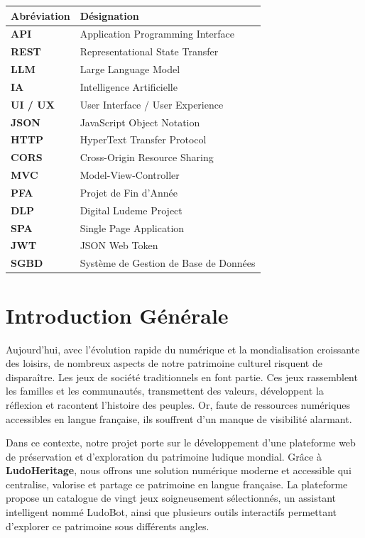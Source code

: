 \documentclass[12pt,a4paper]{report}
\begin{document}
\renewcommand{\arraystretch}{1.7}
\begin{tabular}{>{\bfseries}p{3.5cm} p{10cm}}
\toprule
\textbf{Abréviation} & \textbf{Désignation} \\
\midrule
API     & Application Programming Interface \\
REST    & Representational State Transfer \\
LLM     & Large Language Model \\
IA      & Intelligence Artificielle \\
UI / UX & User Interface / User Experience \\
JSON    & JavaScript Object Notation \\
HTTP    & HyperText Transfer Protocol \\
CORS    & Cross-Origin Resource Sharing \\
MVC     & Model-View-Controller \\
PFA     & Projet de Fin d'Année \\
DLP     & Digital Ludeme Project \\
SPA     & Single Page Application \\
JWT     & JSON Web Token \\
SGBD    & Système de Gestion de Base de Données \\
\bottomrule
\end{tabular}
\renewcommand{\arraystretch}{1}

\newpage
\chapter*{Introduction Générale}
\thispagestyle{fancy}

Aujourd'hui, avec l'évolution rapide du numérique et la mondialisation croissante des
loisirs, de nombreux aspects de notre patrimoine culturel risquent de disparaître. Les
jeux de société traditionnels en font partie. Ces jeux rassemblent les familles et les
communautés, transmettent des valeurs, développent la réflexion et racontent l'histoire
des peuples. Or, faute de ressources numériques accessibles en langue française, ils
souffrent d'un manque de visibilité alarmant.

Dans ce contexte, notre projet porte sur le développement d'une plateforme web de
préservation et d'exploration du patrimoine ludique mondial. Grâce à \textbf{LudoHeritage},
nous offrons une solution numérique moderne et accessible qui centralise, valorise et
partage ce patrimoine en langue française. La plateforme propose un catalogue de vingt
jeux soigneusement sélectionnés, un assistant intelligent nommé LudoBot, ainsi que
plusieurs outils interactifs permettant d'explorer ce patrimoine sous différents angles.
\end{document}
